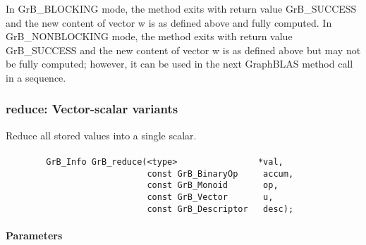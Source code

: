 In {\sf GrB\_BLOCKING} mode, the method exits with return value 
{\sf GrB\_SUCCESS} and the new content of vector {\sf w} is as defined above
and fully computed.  
In {\sf GrB\_NONBLOCKING} mode, the method exits with return value 
{\sf GrB\_SUCCESS} and the new content of vector {\sf w} is as defined above 
but may not be fully computed; however, it can be used in the next GraphBLAS 
method call in a sequence.

\subsubsection{{\sf reduce}: Vector-scalar variants}
\label{Sec:Reduce_vector_scalar}

Reduce all stored values into a single scalar.

\paragraph{\syntax}

\begin{verbatim}
        GrB_Info GrB_reduce(<type>                *val,
                            const GrB_BinaryOp     accum,
                            const GrB_Monoid       op,
                            const GrB_Vector       u,
                            const GrB_Descriptor   desc);
\end{verbatim}

\paragraph{Parameters}

